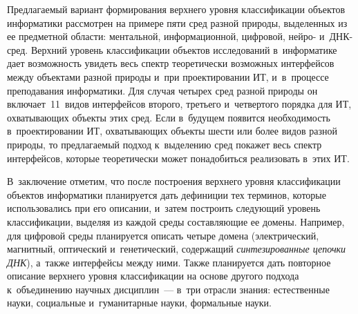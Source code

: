 {\begin{multicols}{2}
  Предлагаемый вариант формирования верхнего уровня классификации 
объектов информатики рас\-смот\-рен на примере пяти сред разной природы, 
выделенных из ее предметной об\-ласти: ментальной, информационной, 
циф\-ро\-вой, нейро- и~ДНК-сред. Верх\-ний уровень классификации объектов 
исследований в~информатике дает воз\-мож\-ность увидеть весь спектр 
тео\-ре\-ти\-че\-ски воз\-мож\-ных интерфейсов меж\-ду объектами разной природы 
и~при проектировании ИТ, и~в~процессе преподавания информатики. Для 
случая четырех сред разной природы он включает~11~видов интерфейсов 
второго, треть\-его и~четвертого порядка для ИТ, охва\-ты\-ва\-ющих объекты этих 
сред. Если в~будущем появится не\-об\-хо\-ди\-мость в~проектировании ИТ, 
охва\-ты\-ва\-ющих объекты шести или более видов разной природы, то 
пред\-ла\-га\-емый подход к~выделению сред покажет весь спектр интерфейсов, 
которые тео\-ре\-ти\-че\-ски может понадобиться реализовать в~этих ИТ.
  
  В~заключение отметим, что после по\-стро\-ения верхнего уров\-ня 
классификации объектов информатики планируется дать дефиниции тех 
терминов, которые использовались при его описании, и~затем по\-стро\-ить 
сле\-ду\-ющий уровень классификации, выделяя из каж\-дой среды со\-став\-ля\-ющие 
ее домены. Например, для циф\-ро\-вой среды планируется описать четыре 
домена (электрический, магнитный, оптический и~генетический, 
содержащий \textit{синтезированные цепочки ДНК}), а~так\-же интерфейсы 
между ними. Также планируется дать повторное описание верх\-не\-го уровня 
классификации на основе другого подхода к~объединению научных 
дис\-цип\-лин~--- в~три отрасли знания: естественные науки, социальные 
и~гуманитарные науки, формальные науки.
  

\end{multicols}}
